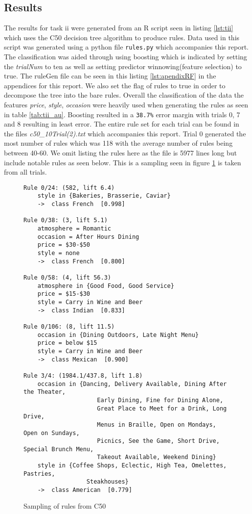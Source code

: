 \documentclass[letterpaper,10pt]{article}
\begin{document}
\subsection*{Results}
The results for task ii were generated from an R script seen in listing \hyperref[lst:tii]{\ref{lst:tii}} which uses the C50 decision tree algorithm to produce rules. Data used in this script was generated using a python file \verb+rules.py+ which accompanies this report. The classification was aided through using boosting which is indicated by setting the \textit{trialNum} to ten as well as setting predictor winnowing(feature selection) to true. The ruleGen file can be seen in this listing \hyperref[lst:apendixRF]{\ref{lst:apendixRF}} in the appendices for this report. We also set the flag of rules to true in order to decompose the tree into the bare rules. \newline\newline
Overall the classification of the data the features \textit{price}, \textit{style}, \textit{occasion} were heavily used when generating the rules as seen in table \hyperref[tab:tii_au]{\ref{tab:tii_au}}. Boosting resulted in a \verb+38.7%+ error margin with trials 0, 7 and 8 resulting in least error. The entire rule set for each trial can be found in the files \textit{c50\_10Trial(2).txt} which accompanies this report.
Trial 0 generated the most number of rules which was 118 with the average number of rules being between 40-60. We omit listing the rules here as the file is 5977 lines long but include notable rules as seen below. This is a sampling seen in figure \hyperref[fig:c50]{\ref{fig:c50}} is taken from all trials.
\begin{figure}[h]
\begin{verbatim}
Rule 0/24: (582, lift 6.4)
	style in {Bakeries, Brasserie, Caviar}
	->  class French  [0.998]

Rule 0/38: (3, lift 5.1)
	atmosphere = Romantic
	occasion = After Hours Dining
	price = $30-$50
	style = none
	->  class French  [0.800]
	
Rule 0/58: (4, lift 56.3)
	atmosphere in {Good Food, Good Service}
	price = $15-$30
	style = Carry in Wine and Beer
	->  class Indian  [0.833]

Rule 0/106: (8, lift 11.5)
	occasion in {Dining Outdoors, Late Night Menu}
	price = below $15
	style = Carry in Wine and Beer
	->  class Mexican  [0.900]
	
Rule 3/4: (1984.1/437.8, lift 1.8)
	occasion in {Dancing, Delivery Available, Dining After the Theater,
                     Early Dining, Fine for Dining Alone,
                     Great Place to Meet for a Drink, Long Drive,
                     Menus in Braille, Open on Mondays, Open on Sundays,
                     Picnics, See the Game, Short Drive, Special Brunch Menu,
                     Takeout Available, Weekend Dining}
	style in {Coffee Shops, Eclectic, High Tea, Omelettes, Pastries,
                  Steakhouses}
	->  class American  [0.779]
\end{verbatim}
\caption{Sampling of rules from C50}
\label{fig:c50} 
\end{figure}
\end{document}
